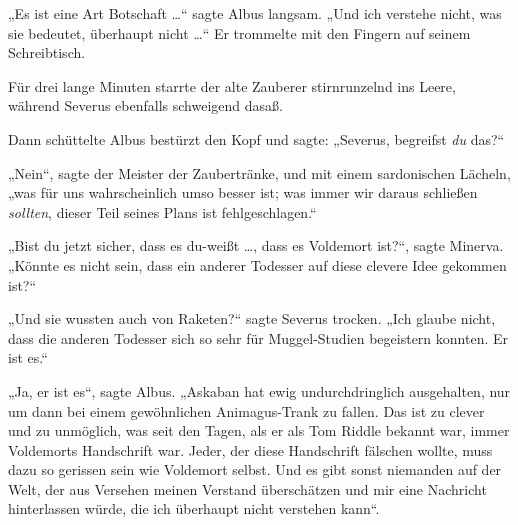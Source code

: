 „Es ist eine Art Botschaft …“ sagte Albus langsam.
„Und ich verstehe nicht, was sie bedeutet, überhaupt nicht …“ Er trommelte mit den Fingern auf seinem Schreibtisch.

Für drei lange Minuten starrte der alte Zauberer stirnrunzelnd ins Leere, während Severus ebenfalls schweigend dasaß.

Dann schüttelte Albus bestürzt den Kopf und sagte:
„Severus, begreifst \emph{du} das?“

„Nein“, sagte der Meister der Zaubertränke, und mit einem sardonischen Lächeln, „was für uns wahrscheinlich umso besser ist; was immer wir daraus schließen \emph{sollten}, dieser Teil seines Plans ist fehlgeschlagen.“

„Bist du jetzt sicher, dass es du-weißt …, dass es Voldemort ist?“, sagte Minerva.
„Könnte es nicht sein, dass ein anderer Todesser auf diese clevere Idee gekommen ist?“

„Und sie wussten auch von Raketen?“ sagte Severus trocken.
„Ich glaube nicht, dass die anderen Todesser sich so sehr für Muggel-Studien begeistern konnten. Er ist es.“

„Ja, er ist es“, sagte Albus.
„Askaban hat ewig undurchdringlich ausgehalten, nur um dann bei einem gewöhnlichen Animagus-Trank zu fallen. Das ist zu clever und zu unmöglich, was seit den Tagen, als er als Tom Riddle bekannt war, immer Voldemorts Handschrift war. Jeder, der diese Handschrift fälschen wollte, muss dazu so gerissen sein wie Voldemort selbst. Und es gibt sonst niemanden auf der Welt, der aus Versehen meinen Verstand überschätzen und mir eine Nachricht hinterlassen würde, die ich überhaupt nicht verstehen kann“.

